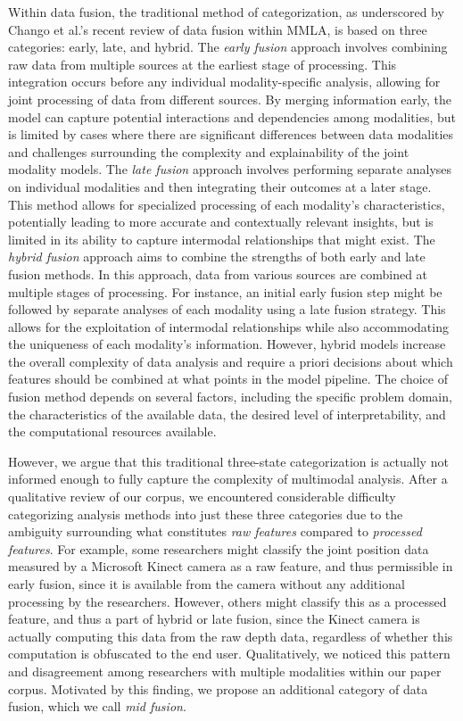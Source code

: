 \documentclass[manuscript,screen,review]{acmart}
\begin{document}
Within data fusion, the traditional method of categorization, as underscored by Chango et al.’s \cite{Chango2022} recent review of data fusion within MMLA, is based on three categories: early, late, and hybrid. The \textit{early fusion} approach involves combining raw data from multiple sources at the earliest stage of processing. This integration occurs before any individual modality-specific analysis, allowing for joint processing of data from different sources. By merging information early, the model can capture potential interactions and dependencies among modalities, but is limited by cases where there are significant differences between data modalities and challenges surrounding the complexity and explainability of the joint modality models. The \textit{late fusion} approach involves performing separate analyses on individual modalities and then integrating their outcomes at a later stage. This method allows for specialized processing of each modality's characteristics, potentially leading to more accurate and contextually relevant insights, but is limited in its ability to capture intermodal relationships that might exist. The \textit{hybrid fusion} approach aims to combine the strengths of both early and late fusion methods. In this approach, data from various sources are combined at multiple stages of processing. For instance, an initial early fusion step might be followed by separate analyses of each modality using a late fusion strategy. This allows for the exploitation of intermodal relationships while also accommodating the uniqueness of each modality's information. However, hybrid models increase the overall complexity of data analysis and require a priori decisions about which features should be combined at what points in the model pipeline. The choice of fusion method depends on several factors, including the specific problem domain, the characteristics of the available data, the desired level of interpretability, and the computational resources available.

However, we argue that this traditional three-state categorization is actually not informed enough to fully capture the complexity of multimodal analysis. After a qualitative review of our corpus, we encountered considerable difficulty categorizing analysis methods into just these three categories due to the ambiguity surrounding what constitutes \textit{raw features} compared to \textit{processed features}. For example, some researchers might classify the joint position data measured by a Microsoft Kinect camera as a raw feature, and thus permissible in early fusion, since it is available from the camera without any additional processing by the researchers. However, others might classify this as a processed feature, and thus a part of hybrid or late fusion, since the Kinect camera is actually computing this data from the raw depth data, regardless of whether this computation is obfuscated to the end user. Qualitatively, we noticed this pattern and disagreement among researchers with multiple modalities within our paper corpus. Motivated by this finding, we propose an additional category of data fusion, which we call \textit{mid fusion}. 
\end{document}
